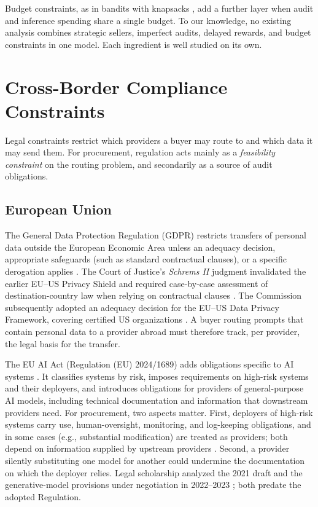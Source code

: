 \documentclass[sigconf]{acmart}
\begin{document}
Budget constraints, as in bandits with knapsacks \cite{badanidiyuru2018bwk}, add a further layer when audit and inference spending share a single budget. To our knowledge, no existing analysis combines strategic sellers, imperfect audits, delayed rewards, and budget constraints in one model. Each ingredient is well studied on its own.

\section{Cross-Border Compliance Constraints}\label{cross-border-compliance-constraints}

Legal constraints restrict which providers a buyer may route to and which data it may send them. For procurement, regulation acts mainly as a \emph{feasibility constraint} on the routing problem, and secondarily as a source of audit obligations.

\subsection{European Union}\label{european-union}

The General Data Protection Regulation (GDPR) restricts transfers of personal data outside the European Economic Area unless an adequacy decision, appropriate safeguards (such as standard contractual clauses), or a specific derogation applies \cite{eu2016gdpr}. The Court of Justice's \emph{Schrems II} judgment invalidated the earlier EU--US Privacy Shield and required case-by-case assessment of destination-country law when relying on contractual clauses \cite{cjeu2020schrems}. The Commission subsequently adopted an adequacy decision for the EU--US Data Privacy Framework, covering certified US organizations \cite{eu2023dpf}. A buyer routing prompts that contain personal data to a provider abroad must therefore track, per provider, the legal basis for the transfer.

The EU AI Act (Regulation (EU) 2024/1689) adds obligations specific to AI systems \cite{eu2024aiact}. It classifies systems by risk, imposes requirements on high-risk systems and their deployers, and introduces obligations for providers of general-purpose AI models, including technical documentation and information that downstream providers need. For procurement, two aspects matter. First, deployers of high-risk systems carry use, human-oversight, monitoring, and log-keeping obligations, and in some cases (e.g., substantial modification) are treated as providers; both depend on information supplied by upstream providers \cite{eu2024aiact}. Second, a provider silently substituting one model for another could undermine the documentation on which the deployer relies. Legal scholarship analyzed the 2021 draft \cite{veale2021demystifying} and the generative-model provisions under negotiation in 2022--2023 \cite{hacker2023regulating}; both predate the adopted Regulation.
\end{document}
